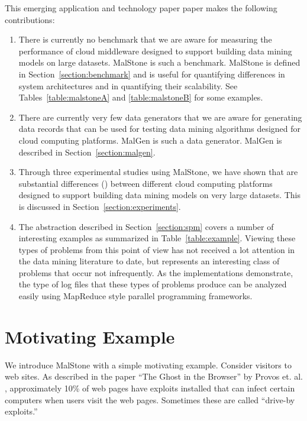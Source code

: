 \documentclass{acm_proc_article-sp}
\def\malstone{MalStone } \def\malgen{MalGen }
\def\malstonens{MalStone} \def\malgenns{MalGen}
\begin{document}
This emerging application and technology paper paper makes the
following contributions:

\begin{enumerate}

\item There is currently no benchmark that we are aware for measuring
  the performance of cloud middleware designed to support building
  data mining models on large datasets. \malstone is such a
  benchmark. \malstone is defined in Section~\ref{section:benchmark}
  and is useful for quantifying differences in system architectures
  and in quantifying their scalability. See
  Tables~\ref{table:malstoneA} and \ref{table:malstoneB} for some
  examples.

\item There are currently very few data generators that we are aware
  for generating data records that can be used for testing data mining
  algorithms designed for cloud computing platforms. \malgen is such
  a data generator. \malgen is described in
  Section~\ref{section:malgen}.

\item Through three experimental studies using \malstonens, we have
  shown that are substantial differences ()
  between different cloud computing platforms designed to support
  building data mining models on very large datasets. This is
  discussed in Section~\ref{section:experiments}.

\item The abstraction described in Section~\ref{section:spm} covers a
  number of interesting examples as summarized in
  Table~\ref{table:example}. Viewing these types of problems from this
  point of view has not received a lot attention in the data mining
  literature to date, but represents an interesting class of problems
  that occur not infrequently. As the implementations demonstrate, the
  type of log files that these types of problems produce can be
  analyzed easily using MapReduce style parallel programming
  frameworks.

\end{enumerate}



\section{Motivating Example}
We introduce \malstone with a simple motivating example. Consider
visitors to web sites. As described in the paper ``The Ghost in the
Browser'' by Provos et. al. \cite{Provos:2007}, approximately 10\% of
web pages have exploits installed that can infect certain computers
when users visit the web pages. Sometimes these are called ``drive-by
exploits.''
\end{document}
